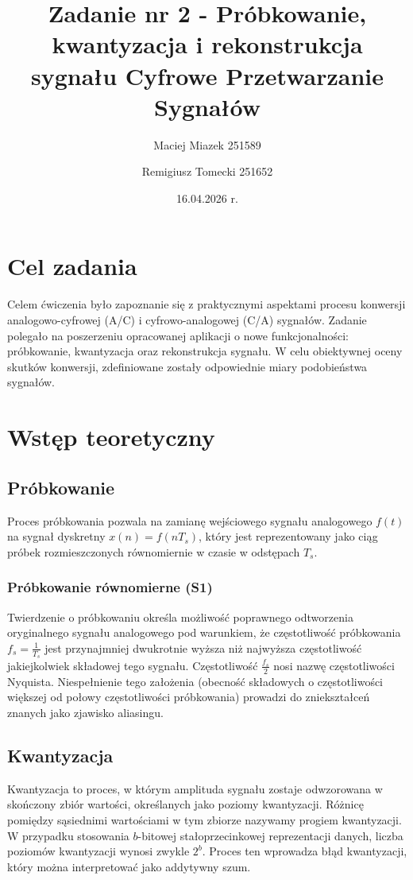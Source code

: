 \documentclass[12pt]{article}
\title{{\bf Zadanie nr 2 - Próbkowanie, kwantyzacja i rekonstrukcja sygnału}\linebreak
Cyfrowe Przetwarzanie Sygnałów}
\author{Maciej Miazek 251589 \and Remigiusz Tomecki 251652}
\date{16.04.2026 r.} %
\begin{document}
\clearpage\maketitle
\thispagestyle{empty}
\newpage
\setcounter{page}{1}

\section{Cel zadania}
Celem ćwiczenia było zapoznanie się z praktycznymi aspektami procesu konwersji analogowo-cyfrowej (A/C) i cyfrowo-analogowej (C/A) sygnałów. Zadanie polegało na poszerzeniu opracowanej aplikacji o nowe funkcjonalności: próbkowanie, kwantyzacja oraz rekonstrukcja sygnału. W celu obiektywnej oceny skutków konwersji, zdefiniowane zostały odpowiednie miary podobieństwa sygnałów.

\section{Wstęp teoretyczny}

\subsection{Próbkowanie}
Proces próbkowania pozwala na zamianę wejściowego sygnału analogowego $f(t)$ na sygnał dyskretny $x(n) = f(nT_s)$, który jest reprezentowany jako ciąg próbek rozmieszczonych równomiernie w czasie w odstępach $T_s$. 

\subsubsection*{Próbkowanie równomierne (S1)}
Twierdzenie o próbkowaniu określa możliwość poprawnego odtworzenia oryginalnego sygnału analogowego pod warunkiem, że częstotliwość próbkowania $f_s = \frac{1}{T_s}$ jest przynajmniej dwukrotnie wyższa niż najwyższa częstotliwość jakiejkolwiek składowej tego sygnału. Częstotliwość $\frac{f_s}{2}$ nosi nazwę częstotliwości Nyquista. Niespełnienie tego założenia (obecność składowych o częstotliwości większej od połowy częstotliwości próbkowania) prowadzi do zniekształceń znanych jako zjawisko aliasingu.

\subsection{Kwantyzacja}
Kwantyzacja to proces, w którym amplituda sygnału zostaje odwzorowana w skończony zbiór wartości, określanych jako poziomy kwantyzacji. Różnicę pomiędzy sąsiednimi wartościami w tym zbiorze nazywamy progiem kwantyzacji. W przypadku stosowania $b$-bitowej stałoprzecinkowej reprezentacji danych, liczba poziomów kwantyzacji wynosi zwykle $2^b$. Proces ten wprowadza błąd kwantyzacji, który można interpretować jako addytywny szum.
\end{document}
